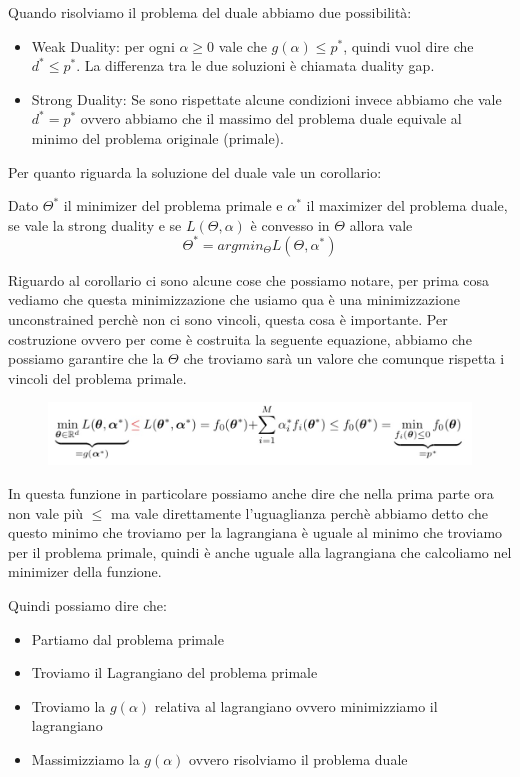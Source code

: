 \documentclass[14pt]{extreport}
\begin{document}
Quando risolviamo il problema del duale abbiamo due possibilità:

\begin{itemize}
	\item Weak Duality: per ogni $\alpha \geq 0$ vale che $g(\alpha) \leq p^*$, quindi vuol dire che $d^* \leq p^*$. La differenza tra le due
	soluzioni è chiamata duality gap.
	\item Strong Duality: Se sono rispettate alcune condizioni invece abbiamo che vale $d^* = p^*$ ovvero abbiamo che il massimo del problema duale
	equivale al minimo del problema originale (primale).
\end{itemize}

Per quanto riguarda la soluzione del duale vale un corollario:

Dato $\Theta^*$ il minimizer del problema primale e $\alpha^*$ il maximizer del problema duale, se vale la strong duality e se $L(\Theta, \alpha)$ è
convesso in $\Theta$ allora vale $$\Theta^* = argmin_\Theta L(\Theta, \alpha^*)$$

Riguardo al corollario ci sono alcune cose che possiamo notare, per prima cosa vediamo che questa minimizzazione che usiamo qua è una minimizzazione
unconstrained perchè non ci sono vincoli, questa cosa è importante. Per costruzione ovvero per come è costruita la seguente equazione, abbiamo che
possiamo garantire che la $\Theta$ che troviamo sarà un valore che comunque rispetta i vincoli del problema primale.

\begin{figure}[H]
	\centering
	\includegraphics[width=0.8\linewidth]{308.jpeg}
\end{figure}

In questa funzione in particolare possiamo anche dire che nella prima parte ora non vale più $\leq$ ma vale direttamente l'uguaglianza perchè abbiamo
detto che questo minimo che troviamo per la lagrangiana è uguale al minimo che troviamo per il problema primale, quindi è anche uguale alla
lagrangiana che calcoliamo nel minimizer della funzione.


Quindi possiamo dire che:

\begin{itemize}
	\item Partiamo dal problema primale
	\item Troviamo il Lagrangiano del problema primale
	\item Troviamo la $g(\alpha)$ relativa al lagrangiano ovvero minimizziamo il lagrangiano
	\item Massimizziamo la $g(\alpha)$ ovvero risolviamo il problema duale
\end{itemize}
\end{document}
